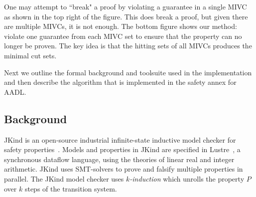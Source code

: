 One may attempt to ``break" a proof by violating a guarantee in a single MIVC as shown in the top right of the figure. This does break a proof, but given there are multiple MIVCs, it is not enough. The bottom figure shows our method: violate one guarantee from each MIVC set to ensure that the property can no longer be proven. The key idea is that the hitting sets of all MIVCs produces the minimal cut sets. 

Next we outline the formal background and toolsuite used in the implementation and then describe the algorithm that is implemented in the safety annex for AADL. 

\subsection{Background}
JKind is an open-source industrial infinite-state inductive model checker for safety properties~\cite{2017arXiv171201222G}. Models and properties in JKind are specified in Lustre~\cite{Halbwachs91:IEEE}, a synchronous dataflow language, using the theories of linear real and integer arithmetic. JKind uses SMT-solvers to prove and falsify multiple properties in parallel. The JKind model checker uses {\em
  $k$-induction} which unrolls the property $P$ over $k$ steps of the
transition system.




